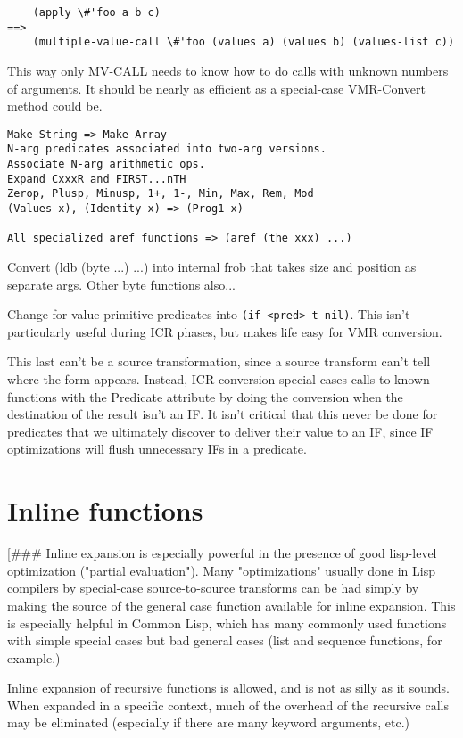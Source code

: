 \begin{verbatim}
    (apply \#'foo a b c)
==>
    (multiple-value-call \#'foo (values a) (values b) (values-list c))
\end{verbatim}

This way only MV-CALL needs to know how to do calls with unknown numbers of
arguments.  It should be nearly as efficient as a special-case VMR-Convert
method could be.


\begin{verbatim}
Make-String => Make-Array
N-arg predicates associated into two-arg versions.
Associate N-arg arithmetic ops.
Expand CxxxR and FIRST...nTH
Zerop, Plusp, Minusp, 1+, 1-, Min, Max, Rem, Mod
(Values x), (Identity x) => (Prog1 x)

All specialized aref functions => (aref (the xxx) ...)
\end{verbatim}

Convert (ldb (byte ...) ...) into internal frob that takes size and position as
separate args.  Other byte functions also...

Change for-value primitive predicates into \verb+(if <pred> t nil)+.  This isn't
particularly useful during ICR phases, but makes life easy for VMR conversion.


This last can't be a source transformation, since a source transform can't tell
where the form appears.  Instead, ICR conversion special-cases calls to known
functions with the Predicate attribute by doing the conversion when the
destination of the result isn't an IF.  It isn't critical that this never be
done for predicates that we ultimately discover to deliver their value to an
IF, since IF optimizations will flush unnecessary IFs in a predicate.


\section{Inline functions}

[\#\#\# Inline expansion is especially powerful in the presence of good lisp-level
optimization ("partial evaluation").  Many "optimizations" usually done in Lisp
compilers by special-case source-to-source transforms can be had simply by
making the source of the general case function available for inline expansion.
This is especially helpful in Common Lisp, which has many commonly used
functions with simple special cases but bad general cases (list and sequence
functions, for example.)

Inline expansion of recursive functions is allowed, and is not as silly as it
sounds.  When expanded in a specific context, much of the overhead of the
recursive calls may be eliminated (especially if there are many keyword
arguments, etc.)

